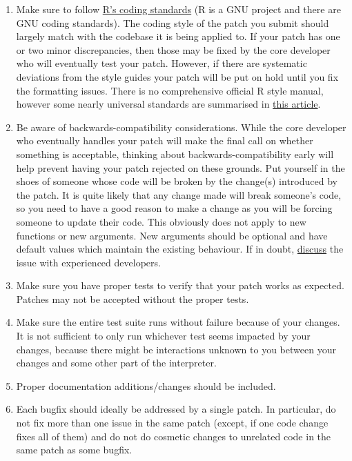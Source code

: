 \documentclass[
]{book}
\begin{document}
\begin{enumerate}
\def\labelenumi{\arabic{enumi}.}
\item
  Make sure to follow \href{https://cran.r-project.org/doc/manuals/r-release/R-ints.html\#R-coding-standards}{R's coding standards} (R is a GNU project and there are GNU coding standards). The coding style of the patch you submit should largely match with the codebase it is being applied to. If your patch has one or two minor discrepancies, then those may be fixed by the core developer who will eventually test your patch. However, if there are systematic deviations from the style guides your patch will be put on hold until you fix the formatting issues. There is no comprehensive official R style manual, however some nearly universal standards are summarised in \href{https://cran.r-project.org/web/packages/rockchalk/vignettes/Rstyle.pdf}{this article}.
\item
  Be aware of backwards-compatibility considerations. While the core developer who eventually handles your patch will make the final call on whether something is acceptable, thinking about backwards-compatibility early will help prevent having your patch rejected on these grounds. Put yourself in the shoes of someone whose code will be broken by the change(s) introduced by the patch. It is quite likely that any change made will break someone's code, so you need to have a good reason to make a change as you will be forcing someone to update their code. This obviously does not apply to new functions or new arguments. New arguments should be optional and have default values which maintain the existing behaviour. If in doubt, \protect\hyperlink{WhereToGetHelp}{discuss} the issue with experienced developers.
\item
  Make sure you have proper tests to verify that your patch works as expected. Patches may not be accepted without the proper tests.
\item
  Make sure the entire test suite runs without failure because of your changes. It is not sufficient to only run whichever test seems impacted by your changes, because there might be interactions unknown to you between your changes and some other part of the interpreter.
\item
  Proper documentation additions/changes should be included.
\item
  Each bugfix should ideally be addressed by a single patch. In particular, do not fix more than one issue in the same patch (except, if one code change fixes all of them) and do not do cosmetic changes to unrelated code in the same patch as some bugfix.
\end{enumerate}
\end{document}

